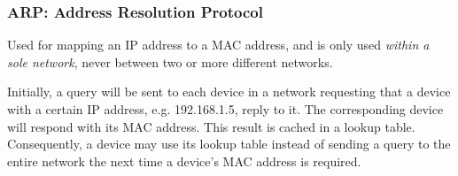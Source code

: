 \documentclass{article}
\begin{document}
\subsubsection{ARP: Address Resolution Protocol}

Used for mapping an IP address to a MAC address, and is only used \textit{within a sole network}, never between two or more different networks.

Initially, a query will be sent to each device in a network requesting that a device with a certain IP address, e.g. 192.168.1.5, reply to it. The corresponding device will respond with its MAC address. This result is cached in a lookup table. Consequently, a device may use its lookup table instead of sending a query to the entire network the next time a device's MAC address is required.
\end{document}
